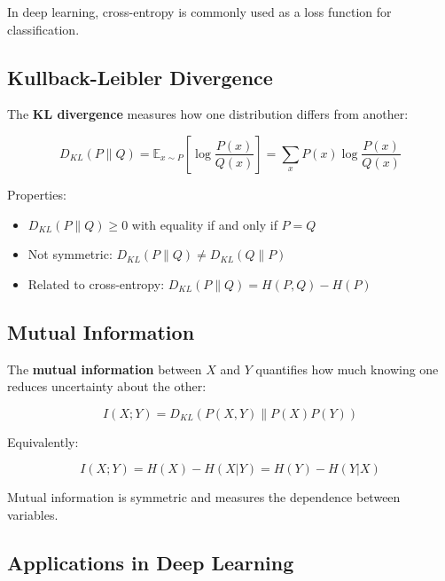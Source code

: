 In deep learning, cross-entropy is commonly used as a loss function for classification.

\subsection{Kullback-Leibler Divergence}

The \textbf{KL divergence} measures how one distribution differs from another:

\begin{equation}
D_{KL}(P \| Q) = \mathbb{E}_{x \sim P}\left[\log \frac{P(x)}{Q(x)}\right] = \sum_{x} P(x) \log \frac{P(x)}{Q(x)}
\end{equation}

Properties:
\begin{itemize}
    \item $D_{KL}(P \| Q) \geq 0$ with equality if and only if $P = Q$
    \item Not symmetric: $D_{KL}(P \| Q) \neq D_{KL}(Q \| P)$
    \item Related to cross-entropy: $D_{KL}(P \| Q) = H(P, Q) - H(P)$
\end{itemize}

\subsection{Mutual Information}

The \textbf{mutual information} between $X$ and $Y$ quantifies how much knowing one reduces uncertainty about the other:

\begin{equation}
I(X; Y) = D_{KL}(P(X, Y) \| P(X)P(Y))
\end{equation}

Equivalently:

\begin{equation}
I(X; Y) = H(X) - H(X|Y) = H(Y) - H(Y|X)
\end{equation}

Mutual information is symmetric and measures the dependence between variables.

\subsection{Applications in Deep Learning}

